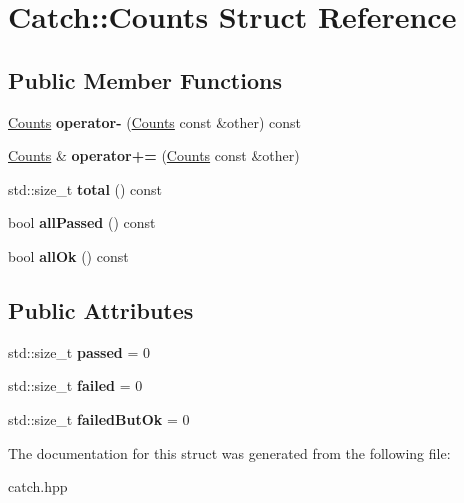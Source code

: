 \hypertarget{struct_catch_1_1_counts}{}\section{Catch\+:\+:Counts Struct Reference}
\label{struct_catch_1_1_counts}
\subsection*{Public Member Functions}
\begin{DoxyCompactItemize}
\item 
\mbox{\label{struct_catch_1_1_counts_aaa10666f559057e3e860d2a5a6fae4c4}} 
\mbox{\hyperlink{struct_catch_1_1_counts}{Counts}} {\bfseries operator-\/} (\mbox{\hyperlink{struct_catch_1_1_counts}{Counts}} const \&other) const
\item 
\mbox{\label{struct_catch_1_1_counts_a322a89475cd2cc039140ef371e973677}} 
\mbox{\hyperlink{struct_catch_1_1_counts}{Counts}} \& {\bfseries operator+=} (\mbox{\hyperlink{struct_catch_1_1_counts}{Counts}} const \&other)
\item 
\mbox{\label{struct_catch_1_1_counts_a94f969c09cf52d1339c085c9603cd1d3}} 
std\+::size\+\_\+t {\bfseries total} () const
\item 
\mbox{\label{struct_catch_1_1_counts_a84999490e0ecaa3de5e121bf48eda1b3}} 
bool {\bfseries all\+Passed} () const
\item 
\mbox{\label{struct_catch_1_1_counts_a33bd996e016030155b99fe1c51c08991}} 
bool {\bfseries all\+Ok} () const
\end{DoxyCompactItemize}
\subsection*{Public Attributes}
\begin{DoxyCompactItemize}
\item 
\mbox{\label{struct_catch_1_1_counts_ad28daaf3de28006400208b6dd0c631e6}} 
std\+::size\+\_\+t {\bfseries passed} = 0
\item 
\mbox{\label{struct_catch_1_1_counts_a19982a3817a3bc2c07f0290e71f497a3}} 
std\+::size\+\_\+t {\bfseries failed} = 0
\item 
\mbox{\label{struct_catch_1_1_counts_ac090973a2ff51394cd452718e75c073e}} 
std\+::size\+\_\+t {\bfseries failed\+But\+Ok} = 0
\end{DoxyCompactItemize}


The documentation for this struct was generated from the following file\+:\begin{DoxyCompactItemize}
\item 
catch.\+hpp\end{DoxyCompactItemize}
